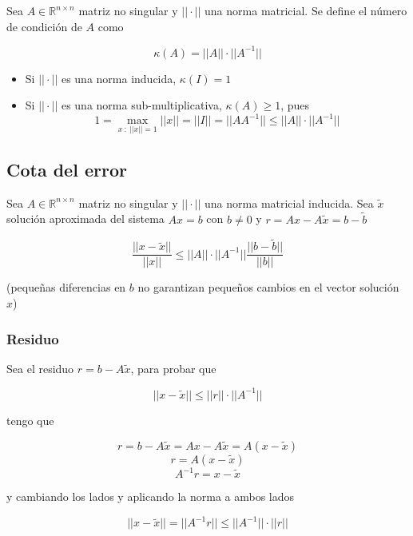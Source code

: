 Sea $A \in \mathbb{R}^{n \times n}$ matriz no singular y $||\cdot||$ una norma matricial. 
Se define el número de condición de $A$ como

\[\kappa(A) = ||A||\cdot||A^{-1}||\]

\begin{itemize}
    \item Si $||\cdot||$ es una norma inducida, $\kappa(I) = 1$
    \item Si $||\cdot||$ es una norma sub-multiplicativa, $\kappa(A) \geq 1$, pues
    \[1 = \underset{x~:~||x||=1}{\max}||x|| = ||I|| = ||AA^{-1}|| \leq ||A||\cdot||A^{-1}||\]
\end{itemize}

\subsection{Cota del error}\label{subsec:cota_de_error}

Sea $A \in \mathbb{R}^{n \times n}$ matriz no singular y $||\cdot||$ una norma matricial inducida. 
Sea $\tilde x$ solución aproximada del sistema $Ax = b$ con $b \neq 0$ y $r = Ax - A\tilde x = b - \tilde b$

\[\frac{||x - \tilde x||}{||x||} \leq ||A||\cdot||A^{-1}||\frac{||b - \tilde b||}{||b||}\]

(pequeñas diferencias en $b$ no garantizan pequeños cambios en el vector solución $x$)

\subsubsection{Residuo}

Sea el residuo $r = b - A\tilde x$, para probar que

\[||x- \tilde x|| \leq ||r||\cdot||A^{-1}||\]

tengo que 

\[r = b - A\tilde x = Ax - A\tilde x = A(x-\tilde x)\]
\[r = A(x-\tilde x)\]
\[A^{-1}r = x - \tilde x\]

y cambiando los lados y aplicando la norma a ambos lados

\[||x - \tilde x|| = ||A^{-1}r|| \leq ||A^{-1}||\cdot||r||\]

\[\]
